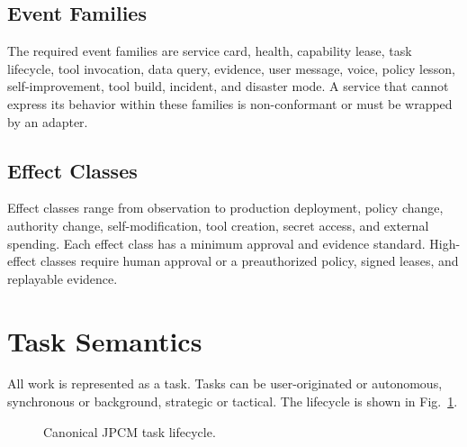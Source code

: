 \documentclass[10pt,journal,onecolumn]{IEEEtran}
\begin{document}
\subsection{Event Families}
The required event families are service card, health, capability lease, task lifecycle, tool invocation, data query, evidence, user message, voice, policy lesson, self-improvement, tool build, incident, and disaster mode. A service that cannot express its behavior within these families is non-conformant or must be wrapped by an adapter.

\subsection{Effect Classes}
Effect classes range from observation to production deployment, policy change, authority change, self-modification, tool creation, secret access, and external spending. Each effect class has a minimum approval and evidence standard. High-effect classes require human approval or a preauthorized policy, signed leases, and replayable evidence.

\section{Task Semantics}
All work is represented as a task. Tasks can be user-originated or autonomous, synchronous or background, strategic or tactical. The lifecycle is shown in Fig.~\ref{fig:task}.

\begin{figure}[h]
\centering
{}
\caption{Canonical JPCM task lifecycle.}
\label{fig:task}
\end{figure}
\end{document}
